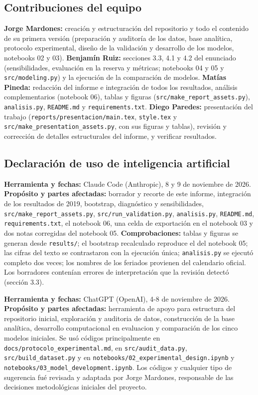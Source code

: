 \subsection{Contribuciones del equipo}

\textbf{Jorge Mardones:} creación y estructuración del repositorio y todo el contenido de su primera versión (preparación y auditoría de los datos, base analítica, protocolo experimental, diseño de la validación y desarrollo de los modelos, notebooks 02 y 03). \textbf{Benjamín Ruiz:} secciones 3.3, 4.1 y 4.2 del enunciado (sensibilidades, evaluación en la reserva y métricas; notebooks 04 y 05 y \texttt{src/modeling.py}) y la ejecución de la comparación de modelos. \textbf{Matías Pineda:} redacción del informe e integración de todos los resultados, análisis complementarios (notebook 06), tablas y figuras (\texttt{src/make\_report\_assets.py}), \texttt{analisis.py}, \texttt{README.md} y \texttt{requirements.txt}. \textbf{Diego Paredes:} presentación del trabajo (\texttt{reports/presentacion/main.tex}, \texttt{style.tex} y \texttt{src/make\_presentation\_assets.py}, con sus figuras y tablas), revisión y corrección de detalles estructurales del informe, y verificar resultados.

\subsection{Declaración de uso de inteligencia artificial}

\textbf{Herramienta y fechas:} Claude Code (Anthropic), 8 y 9 de noviembre de 2026. \textbf{Propósito y partes afectadas:} borrador y recorte de este informe, integración de los resultados de 2019, bootstrap, diagnóstico y sensibilidades, \texttt{src/make\_report\_assets.py}, \texttt{src/run\_validation.py}, \texttt{analisis.py}, \texttt{README.md}, \texttt{requirements.txt}, el notebook 06, una celda de exportación en el notebook 03 y dos notas corregidas del notebook 05. \textbf{Comprobaciones:} tablas y figuras se generan desde \texttt{results/}; el bootstrap recalculado reproduce el del notebook 05; las cifras del texto se contrastaron con la ejecución única; \texttt{analisis.py} se ejecutó completo dos veces; los nombres de los feriados provienen del calendario oficial. Los borradores contenían errores de interpretación que la revisión detectó (sección 3.3).

\textbf{Herramienta y fechas:} ChatGPT (OpenAI), 4-8 de noviembre de 2026. \textbf{Propósito y partes afectadas:} herramienta de apoyo para estructura del repositorio inicial, exploración y auditoria de datos, construcción de la base analítica, desarrollo computacional en evaluacion y comparación de los cinco modelos iniciales. Se usó códigos principalmente en \texttt{docs/protocolo\_experimental.md}, en \texttt{src/audit\_data.py}, \texttt{src/build\_dataset.py} y en \texttt{notebooks/02\_experimental\_design.ipynb} y \texttt{notebooks/03\_model\_development.ipynb}. Los códigos y cualquier tipo de sugerencia fué revisada y adaptada por Jorge Mardones, responsable de las decisiones metodológicas iniciales del proyecto.

